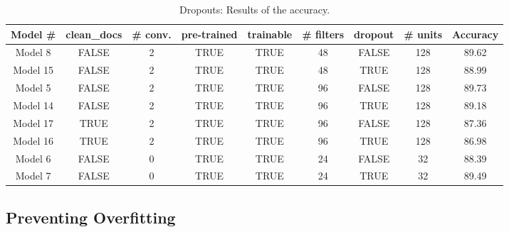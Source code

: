 \documentclass[11pt]{article}
\begin{document}
\begin{table}[h]
\centering
\begin{tabular}{||c|c|c|c|c|c|c|c|c||}
\hline
Model \# & clean\_docs &	\# conv.	& pre-trained &	trainable &	\# filters	& dropout &	\# units & Accuracy\\
\hline
Model	8	&	FALSE	&	2	&	TRUE	&	TRUE	&	48	&	\cellcolor{blue!25}FALSE	&	128	&	\cellcolor{blue!25}89.62	\\
\hline
Model	15	&	FALSE	&	2	&	TRUE	&	TRUE	&	48	&	\cellcolor{yellow!25}TRUE	&	128	&	88.99	\\
\hline
\hline
Model 5	&	FALSE	&	2	&	TRUE	&	TRUE	&	96	&	\cellcolor{blue!25}FALSE	&	128	&	\cellcolor{blue!25}89.73\\
\hline
Model	14	&	FALSE	&	2	&	TRUE	&	TRUE	&	96	&	\cellcolor{yellow!25}TRUE	&	128	&	89.18	\\
\hline
\hline
Model	17	&	TRUE	&	2	&	TRUE	&	TRUE	&	96	&	\cellcolor{blue!25}FALSE	&	128	&	\cellcolor{blue!25}87.36\\
\hline
Model	16	&	TRUE	&	2	&	TRUE	&	TRUE	&	96	&	\cellcolor{yellow!25}TRUE	&	128	&	86.98	\\
\hline
\hline
Model	6	&	FALSE	&	0	&	TRUE	&	TRUE	&	24	&	\cellcolor{yellow!25}FALSE	&	32	&	88.39	\\
\hline
Model	7	&	FALSE	&	0	&	TRUE	&	TRUE	&	24	&	\cellcolor{blue!25}TRUE	&	32	&	\cellcolor{blue!25}89.49	\\
\hline
\end{tabular}
\caption{Dropouts: Results of the accuracy.}
\label{table:acc_dropout}
\end{table}


\subsection{Preventing Overfitting}
\label{Preventing Overfitting}
\end{document}
